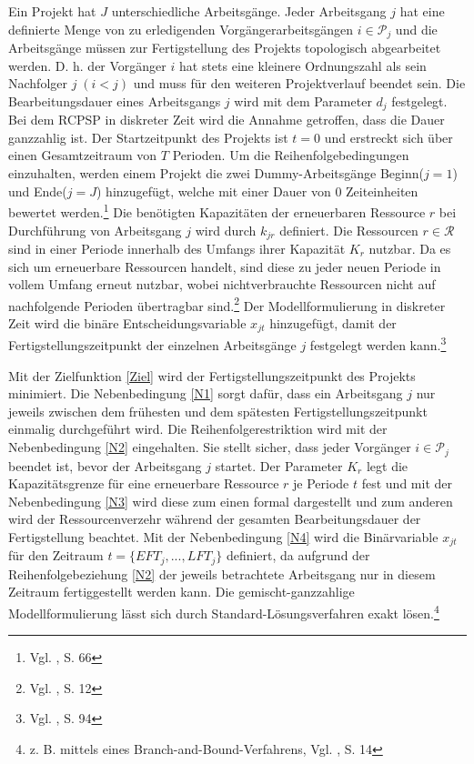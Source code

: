 \documentclass[a4paper,12pt,normalheadings,footexclude,headinclude,liststotoc,nochapterprefix,onecolumn,oneside,parskip,pointlessnumbers]{scrreprt}
\begin{document}
Ein Projekt hat $J$ unterschiedliche Arbeitsgänge. Jeder Arbeitsgang $j$ hat eine definierte Menge von zu erledigenden Vorgängerarbeitsgängen $i \in \mathcal{P}_{j}$ und die Arbeitsgänge müssen zur Fertigstellung des Projekts topologisch abgearbeitet werden. D. h. der Vorgänger $i$ hat stets eine kleinere Ordnungszahl als sein Nachfolger $j\;(i<j)$ und muss für den weiteren Projektverlauf beendet sein. Die Bearbeitungsdauer eines Arbeitsgangs $j$ wird mit dem Parameter $d_{j}$ festgelegt.  Bei dem RCPSP in diskreter Zeit wird die Annahme getroffen, dass die Dauer ganzzahlig ist. Der Startzeitpunkt des Projekts ist $t = 0$ und erstreckt sich über einen Gesamtzeitraum von $T$ Perioden. Um die Reihenfolgebedingungen einzuhalten, werden einem Projekt die zwei Dummy-Arbeitsgänge \glqq Beginn\grqq\;($j=1$) und \glqq Ende\grqq\;($j=J$) hinzugefügt, welche mit einer Dauer von $0$ Zeiteinheiten bewertet werden.\footnote{Vgl. \cite{zimmermann2006projektplanung}, S. 66} Die benötigten Kapazitäten der erneuerbaren Ressource $r$ bei Durchführung von Arbeitsgang $j$ wird durch $k_{jr}$ definiert. Die Ressourcen $r \in \mathcal{R}$ sind in einer Periode innerhalb des Umfangs ihrer Kapazität $K_{r}$ nutzbar. Da es sich um erneuerbare Ressourcen handelt, sind diese zu jeder neuen Periode in vollem Umfang erneut nutzbar, wobei nichtverbrauchte Ressourcen nicht auf nachfolgende Perioden übertragbar sind.\footnote{Vgl. \cite{kellenbrink2014einfuhrung}, S. 12} Der Modellformulierung in diskreter Zeit wird die binäre Entscheidungsvariable $x_{jt}$ hinzugefügt, damit der Fertigstellungszeitpunkt der einzelnen Arbeitsgänge $j$  festgelegt werden kann.\footnote{Vgl. \cite{pritsker1969multiproject}, S. 94} %

Mit der Zielfunktion \eqref{Ziel} wird der Fertigstellungszeitpunkt des Projekts minimiert. Die Nebenbedingung \eqref{N1} sorgt dafür, dass ein Arbeitsgang $j$ nur jeweils zwischen dem frühesten und dem spätesten Fertigstellungszeitpunkt einmalig durchgeführt wird. Die Reihenfolgerestriktion wird mit der Nebenbedingung \eqref{N2} eingehalten. Sie stellt sicher, dass jeder Vorgänger $i \in \mathcal{P}_{j}$ beendet ist, bevor der Arbeitsgang $j$ startet.
Der Parameter $K_{r}$ legt die Kapazitätsgrenze für eine erneuerbare Ressource $r$ je Periode $t$ fest und mit der Nebenbedingung \eqref{N3} wird diese zum einen formal dargestellt und zum anderen wird der Ressourcenverzehr während der gesamten Bearbeitungsdauer der Fertigstellung beachtet.
Mit der Nebenbedingung \eqref{N4} wird die Binärvariable $x_{jt}$ für den Zeitraum $t = \{EFT_{j},...,LFT_{j}\}$ definiert, da aufgrund der Reihenfolgebeziehung \eqref{N2} der jeweils betrachtete Arbeitsgang nur in diesem Zeitraum fertiggestellt werden kann. Die gemischt-ganzzahlige Modellformulierung lässt sich durch Standard-Lösungsverfahren exakt lösen.\footnote{z. B. mittels eines Branch-and-Bound-Verfahrens, Vgl. \cite{kellenbrink2014einfuhrung}, S. 14}
\end{document}
